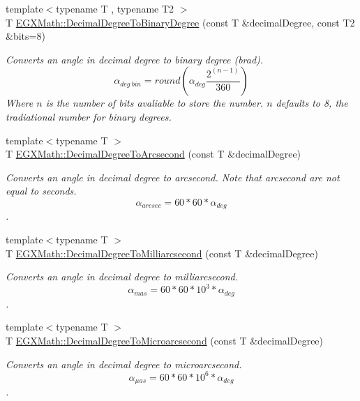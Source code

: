 \begin{DoxyCompactItemize}
{\footnotesize template$<$typename T , typename T2 $>$ }\\T \mbox{\hyperlink{group___e_g_x_math-_angle_conversions-_decimal_degree_gaceec7ae7988c7f342d0b0fa6940720a1}{E\+G\+X\+Math\+::\+Decimal\+Degree\+To\+Binary\+Degree}} (const T \&decimal\+Degree, const T2 \&bits=8)
\begin{DoxyCompactList}\small\item\em Converts an angle in decimal degree to binary degree (brad). \[\alpha_{deg\ bin}=round(\alpha_{deg}\frac{2^(n-1)}{360})\] Where $n$ is the number of bits avaliable to store the number. $n$ defaults to 8, the tradiational number for binary degrees. \end{DoxyCompactList}\item 
{\footnotesize template$<$typename T $>$ }\\T \mbox{\hyperlink{group___e_g_x_math-_angle_conversions-_decimal_degree_gab9d5635a6e35127b5245978aba508962}{E\+G\+X\+Math\+::\+Decimal\+Degree\+To\+Arcsecond}} (const T \&decimal\+Degree)
\begin{DoxyCompactList}\small\item\em Converts an angle in decimal degree to arcsecond. Note that arcsecond are not equal to seconds. \[\alpha_{arcsec}=60 * 60 * \alpha_{deg}\]. \end{DoxyCompactList}\item 
{\footnotesize template$<$typename T $>$ }\\T \mbox{\hyperlink{group___e_g_x_math-_angle_conversions-_decimal_degree_gadb9ff3c92cf7484793f91e7de80c222e}{E\+G\+X\+Math\+::\+Decimal\+Degree\+To\+Milliarcsecond}} (const T \&decimal\+Degree)
\begin{DoxyCompactList}\small\item\em Converts an angle in decimal degree to milliarcsecond. \[\alpha_{mas}=60 * 60 * 10^3 * \alpha_{deg} \]. \end{DoxyCompactList}\item 
{\footnotesize template$<$typename T $>$ }\\T \mbox{\hyperlink{group___e_g_x_math-_angle_conversions-_decimal_degree_ga6fa88456069907fd24716fa575517571}{E\+G\+X\+Math\+::\+Decimal\+Degree\+To\+Microarcsecond}} (const T \&decimal\+Degree)
\begin{DoxyCompactList}\small\item\em Converts an angle in decimal degree to microarcsecond. \[\alpha_{\mu as}=60 * 60 * 10^6 * \alpha_{deg}\]. \end{DoxyCompactList}\item 

\end{DoxyCompactItemize}
